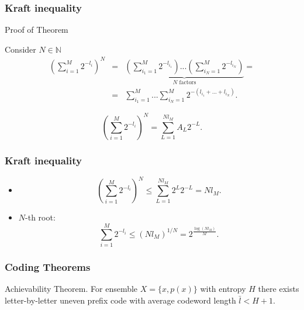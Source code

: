 \documentclass[14pt]{beamer}
\begin{document}
\begin{frame}
\frametitle{Kraft inequality}
Proof of Theorem
\begin{itemize}    
\small{

    \item Consider $N \in \mathbb{N}$
    \begin{eqnarray*}
     \left( {\sum\limits_{i = 1}^M {2^{ - l_i }} }
    \right)^N &=& \underbrace {\left( {\sum\limits_{i_1 = 1}^M {2^{ -
    l_{i_1 } }} } \right)...\left( {\sum\limits_{i_N = 1}^M {2^{ -
    l_{i_N } }} } \right)}_{N\mbox{ factors}} = \\
    &=&\sum\limits_{i_1 = 1}^M {...\sum\limits_{i_N = 1}^M {2^{ -
    (l_{i_1 } + ... + l_{i_N } )}} } .
    \end{eqnarray*}

    \item 
    \[
    \left( {\sum\limits_{i = 1}^M {2^{ - l_i }} } \right)^N = \sum\limits_{L =
    1}^{Nl_M } {A_L 2^{ - L}} .
    \]
}
\end{itemize}
\end{frame}


\begin{frame}
\frametitle{Kraft inequality}
\begin{itemize}    

    \item
    \[
    \left( {\sum\limits_{i = 1}^M {2^{ - l_i }} } \right)^N \le \sum\limits_{L =
    1}^{Nl_M } {2^L2^{ - L} = Nl_M } .
    \]
    
    \item $N$-th root:
    \[
    \sum\limits_{i = 1}^M {2^{ - l_i }} \le \left( {Nl_M } \right)^{1 / N} = 2^{\frac{\log (Nl_M )}{M}}.
    \]
        
\end{itemize}
\end{frame}



\begin{frame}
\frametitle{Coding Theorems}  

    \begin{theorem}{Achievability Theorem.}
    \label{PTK}
    For ensemble $X = \{x,p(x)\}$ with entropy $H$ there exists letter-by-letter uneven prefix code with average codeword length $\bar {l} < H + 1$. \end{theorem}

\end{frame}
\end{document}
